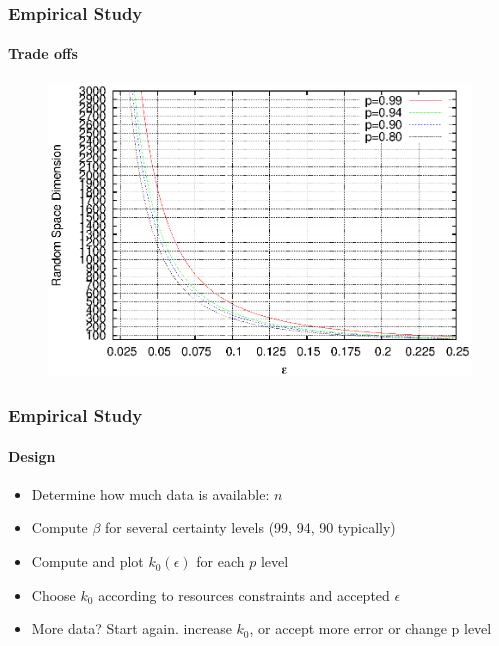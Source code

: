 \documentclass{beamer}
\begin{document}
\begin{frame}
\frametitle{Empirical Study}
\framesubtitle{Trade offs}
 		\begin{figure}
		\includegraphics[scale=0.9]{tradeoffs2.eps}
	\end{figure}
\end{frame} 

\begin{frame}
\frametitle{Empirical Study}
\framesubtitle{Design}

\begin{itemize}
  \item Determine how much data is available: $n$
  \item Compute $\beta$ for several certainty levels (99, 94, 90 typically)
  \item Compute and plot $k_{0}(\epsilon)$ for each $p$ level
  \item Choose $k_{0}$ according to resources constraints and accepted $\epsilon$
  \item More data? Start again. increase $k_{0}$, or accept more error or change p level
\end{itemize}
\end{frame} 
\end{document}
